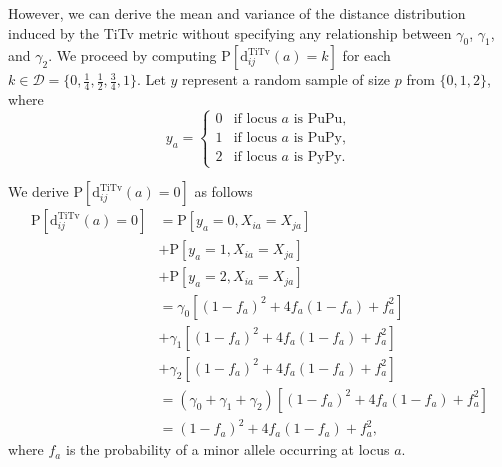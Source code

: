 \documentclass[aos]{imsart}
\begin{document}
However, we can derive the mean and variance of the distance distribution induced by the TiTv metric without specifying any relationship between $\gamma_0$, $\gamma_1$, and $\gamma_2$. We proceed by computing $\text{P}\left[\text{d}^\text{TiTv}_{ij}(a) = k\right]$ for each $k \in \mathcal{D} = \bigl\{0,\frac{1}{4},\frac{1}{2},\frac{3}{4},1\bigr\}$. Let $y$ represent a random sample of size $p$ from $\{0,1,2\}$, where 
%
\begin{equation}\label{eq:yvec}
y_a = \begin{cases}
0 & \text{if locus } a \text{ is PuPu}, \\
1 & \text{if locus } a \text{ is PuPy}, \\
2 & \text{if locus } a \text{ is PyPy}.
\end{cases}
\end{equation}

We derive $\text{P}\left[\text{d}^\text{TiTv}_{ij}(a) = 0\right]$ as follows
%
\begin{equation}\label{eq:prob_TiTv_0}
\begin{aligned}
\text{P}\left[\text{d}^\text{TiTv}_{ij}(a) = 0\right] &= \text{P}\left[y_a = 0, X_{ia} = X_{ja}\right] \\
&+ \text{P}\left[y_a = 1, X_{ia} = X_{ja}\right] \\
&+ \text{P}\left[y_a = 2, X_{ia} = X_{ja}\right] \\
&= \gamma_0 \left[(1 - f_a)^2 + 4 f_a (1 - f_a) + f^2_a\right] \\
&+ \gamma_1 \left[(1 - f_a)^2 + 4 f_a (1 - f_a) + f^2_a\right] \\
&+ \gamma_2 \left[(1 - f_a)^2 + 4 f_a (1 - f_a) + f^2_a\right] \\
&= (\gamma_0 + \gamma_1 + \gamma_2)\left[(1 - f_a)^2 + 4 f_a (1 - f_a) + f^2_a\right] \\
&= (1 - f_a)^2 + 4 f_a (1 - f_a) + f^2_a,
\end{aligned}
\end{equation}
%
where $f_a$ is the probability of a minor allele occurring at locus $a$.
\end{document}
